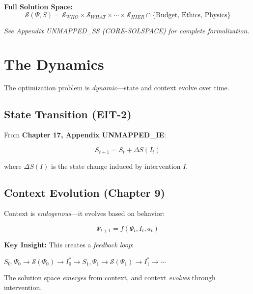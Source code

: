 \textbf{Full Solution Space:}
\begin{equation}
\mathcal{S}(\Psi, S) = \mathcal{S}_{WHO} \times \mathcal{S}_{WHAT} \times \cdots \times \mathcal{S}_{HIER} \cap \{\text{Budget, Ethics, Physics}\}
\end{equation}

\textit{See Appendix UNMAPPED_SS (CORE-SOLSPACE) for complete formalization.}

\section{The Dynamics}
\label{sec:mp-dynamics}

The optimization problem is \textit{dynamic}---state and context evolve over time.

\subsection{State Transition (EIT-2)}

From \textbf{Chapter 17, Appendix UNMAPPED_IE}:

\begin{equation}
\boxed{
S_{t+1} = S_t + \Delta S(I_t)
}
\label{eq:mp-state-transition}
\end{equation}

where $\Delta S(I)$ is the state change induced by intervention $I$.

\subsection{Context Evolution (Chapter 9)}

Context is \textit{endogenous}---it evolves based on behavior:

\begin{equation}
\boxed{
\Psi_{t+1} = f(\Psi_t, I_t, a_t)
}
\label{eq:mp-context-evolution}
\end{equation}

\textbf{Key Insight:} This creates a \textit{feedback loop}:
\begin{center}
$S_0, \Psi_0 \to \mathcal{S}(\Psi_0) \to I^*_0 \to S_1, \Psi_1 \to \mathcal{S}(\Psi_1) \to I^*_1 \to \cdots$
\end{center}

The solution space \textit{emerges} from context, and context \textit{evolves} through intervention.

